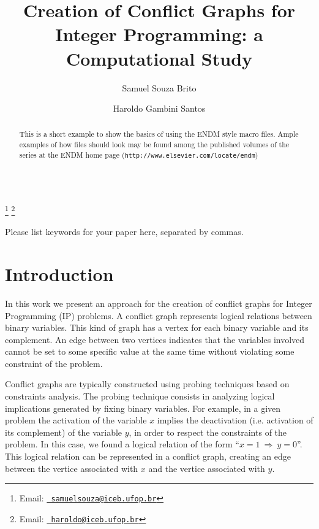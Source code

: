 \documentclass{endm}
\begin{document}
  

\begin{verbatim}\end{verbatim}\vspace{2.5cm}

\begin{frontmatter}

\title{Creation of Conflict Graphs for Integer Programming: a Computational Study}

\author{Samuel Souza Brito \and Haroldo Gambini Santos}
 
\address{Computing Department\\ Universidade Federal de Ouro Preto - UFOP\\ Ouro Preto, Brazil}
\thanks[myemail]{Email:
   \href{mailto:samuelsouza@iceb.ufop.br} {\texttt{\normalshape
   samuelsouza@iceb.ufop.br}}} \thanks[coemail]{Email:
   \href{mailto:haroldo@iceb.ufop.br} {\texttt{\normalshape
   haroldo@iceb.ufop.br}}}

\begin{abstract}
This is a short example to show the basics of using the ENDM style
macro files. Ample examples of how files should look may be found
among the published volumes of the series at the ENDM home page
({\texttt{http://www.elsevier.com/locate/endm}})
\end{abstract}

\begin{keyword}
Please list keywords for your paper here, separated by commas.
\end{keyword}

\end{frontmatter}


\section{Introduction}\label{intro}

In this work we present an approach for the creation of conflict graphs for Integer Programming (IP) problems. A conflict graph represents logical relations between binary variables. This kind of graph has a vertex for each binary variable and its complement. An edge between two vertices indicates that the variables involved cannot be set to some specific value at the same time without violating some constraint of the problem.

Conflict graphs are typically constructed using probing techniques \cite{Borndorfer1998} based on constraints analysis. The probing technique consists in analyzing logical implications generated by fixing binary variables. For example, in a given problem the activation of the variable $x$ implies the deactivation (i.e. activation of its complement) of the variable $y$, in order to respect the constraints of the problem. In this case, we found a logical relation of the form ``$x = 1 \ \Rightarrow \ y = 0$''. This logical relation can be represented in a conflict graph, creating an edge between the vertice associated with $x$ and the vertice associated with $y$.
\end{document}
